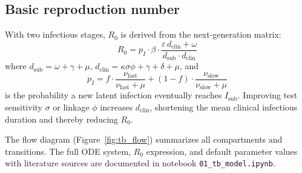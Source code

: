 \documentclass[11pt]{article}
\begin{document}
\subsection{Basic reproduction number}

With two infectious stages, $R_0$ is derived from the next-generation matrix:
\[
  R_0 = p_I \cdot \beta \cdot \frac{\varepsilon\, d_\text{clin} + \omega}{d_\text{sub}\cdot d_\text{clin}}
\]
where $d_\text{sub} = \omega + \gamma + \mu$, $d_\text{clin} = \kappa\sigma\phi + \gamma + \delta + \mu$, and
\[
  p_I = f\cdot\frac{\nu_\text{fast}}{\nu_\text{fast}+\mu} + (1-f)\cdot\frac{\nu_\text{slow}}{\nu_\text{slow}+\mu}
\]
is the probability a new latent infection eventually reaches $I_\text{sub}$. Improving test sensitivity $\sigma$ or linkage $\phi$ increases $d_\text{clin}$, shortening the mean clinical infectious duration and thereby reducing $R_0$.

The flow diagram (Figure~\ref{fig:tb_flow}) summarizes all compartments and transitions. The full ODE system, $R_0$ expression, and default parameter values with literature sources are documented in notebook \texttt{01\_tb\_model.ipynb}.



\end{document}
